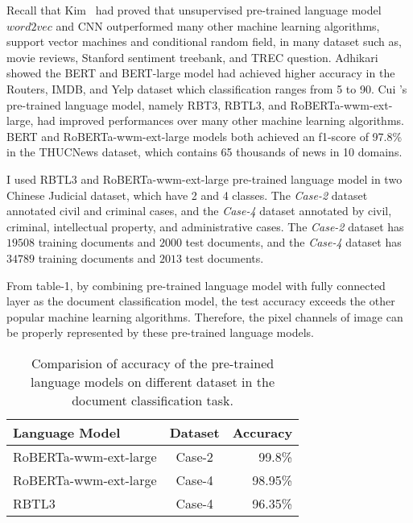 \documentclass[review]{cvpr}
\begin{document}
\par Recall that Kim~\cite{kim2014convolutional} had proved that unsupervised pre-trained language model $word2vec$ and CNN outperformed many other machine learning algorithms,
\eg support vector machines and conditional random field, in many dataset such as, movie reviews, Stanford sentiment treebank, and TREC question.
Adhikari \etal~\cite{adhikari2019docbert} showed the BERT and BERT-large model had achieved higher accuracy in the Routers, IMDB, and Yelp dataset which classification ranges from 5 to 90.
Cui \etal's pre-trained language model, namely RBT3, RBTL3, and RoBERTa-wwm-ext-large, had improved performances over many other machine learning algorithms.
BERT and RoBERTa-wwm-ext-large models both achieved an f1-score of 97.8\% in the THUCNews dataset, which contains 65 thousands of news in 10 domains.

\par I used RBTL3 and RoBERTa-wwm-ext-large pre-trained language model in two Chinese Judicial dataset, which have 2 and 4 classes.
The \textit{Case-2} dataset annotated civil and criminal cases, and the \textit{Case-4} dataset annotated by civil, criminal, intellectual property, and administrative cases.
The \textit{Case-2} dataset has $19508$ training documents and $2000$ test documents, and the \textit{Case-4} dataset has $34789$ training documents and $2013$ test documents.

\par From table-1, by combining pre-trained language model with fully connected layer as the document classification model,
the test accuracy exceeds the other popular machine learning algorithms.
Therefore, the pixel channels of image can be properly represented by these pre-trained language models.

\begin{table}
\begin{center}
\begin{tabular}{|l|c|r|}
\hline
Language Model 	& Dataset & Accuracy \\
\hline\hline
RoBERTa-wwm-ext-large & Case-2	&	99.8\% \\
RoBERTa-wwm-ext-large & Case-4	&	98.95\% \\
RBTL3  & Case-4	&	96.35\% \\
\hline
\end{tabular}
\end{center}
\caption{Comparision of accuracy of the pre-trained language models on different dataset in the document classification task.}
\end{table}
\end{document}

